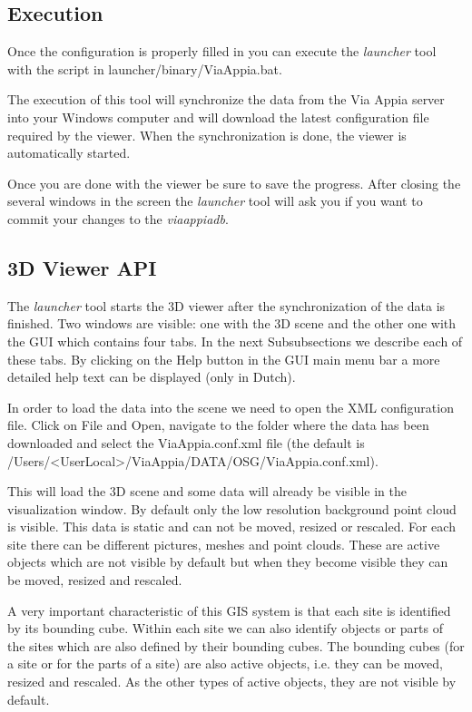 \documentclass[a4paper,11pt]{article}
\begin{document}
\subsection{Execution}

Once the configuration is properly filled in you can execute the \textit{launcher} tool with the script in launcher/binary/ViaAppia.bat. 

The execution of this tool will synchronize the data from the Via Appia server into your Windows computer and will download the latest configuration file required by the viewer.
When the synchronization is done, the viewer is automatically started. 

Once you are done with the viewer be sure to save the progress. After closing the several windows in the screen the \textit{launcher} tool will ask you if you want to commit your changes to the \textit{viaappiadb}.

\subsection{3D Viewer API}

The \textit{launcher} tool starts the 3D viewer after the synchronization of the data is finished. Two windows are visible: one with the 3D scene and the other one with the GUI which contains four tabs. In the next Subsubsections we describe each of these tabs. By clicking on the Help button in the GUI main menu bar a more detailed help text can be displayed (only in Dutch). 

In order to load the data into the scene we need to open the XML configuration file. Click on File and Open, navigate to the folder where the data has been downloaded and select the ViaAppia.conf.xml file (the default is /Users/\textless{}UserLocal\textgreater{}/ViaAppia/DATA/OSG/ViaAppia.conf.xml).

This will load the 3D scene and some data will already be visible in the visualization window. By default only the low resolution background point cloud is visible. This data is static and can not be moved, resized or rescaled. For each site there can be different pictures, meshes and point clouds. These are active objects which are not visible by default but when they become visible they can be moved, resized and rescaled.

A very important characteristic of this GIS system is that each site is identified by its bounding cube. Within each site we can also identify objects or parts of the sites which are also defined by their bounding cubes. The bounding cubes (for a site or for the parts of a site) are also active objects, i.e. they can be moved, resized and rescaled. As the other types of active objects, they are not visible by default.
\end{document}
